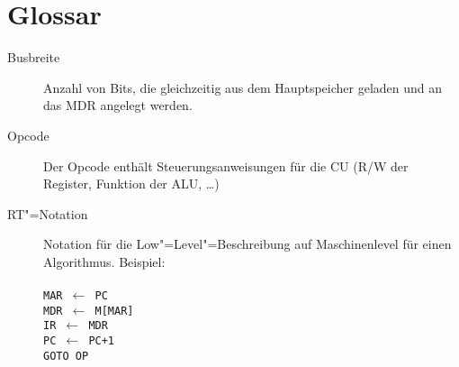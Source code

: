 \chapter{Glossar}
\label{chapter:Anhang-Glossar}

\begin{description}
    \item[Busbreite] Anzahl von Bits, die gleichzeitig aus dem Hauptspeicher geladen und an das MDR angelegt werden.
    \item[Opcode] Der Opcode enthält Steuerungsanweisungen für die CU (R/W der Register, Funktion der ALU, \ldots)
    \item[RT"=Notation] Notation für die Low"=Level"=Beschreibung auf Maschinenlevel für einen Algorithmus. Beispiel:\\ 
    \\
    \texttt{MAR $\leftarrow$ PC\\
    MDR $\leftarrow$ M[MAR]\\
    IR $\leftarrow$ MDR\\
    PC $\leftarrow$ PC+1\\
    GOTO OP}
\end{description}
